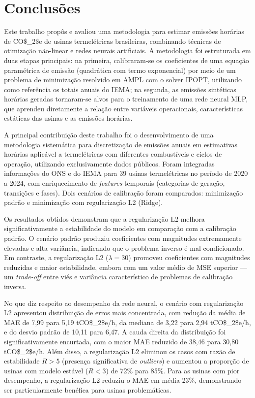 \chapter{Conclusões}\label{chp:conc}

Este trabalho propôs e avaliou uma metodologia para estimar emissões horárias de \ac{CO$_2$e} de usinas termelétricas brasileiras, combinando técnicas de otimização não-linear e redes neurais artificiais. A metodologia foi estruturada em duas etapas principais: na primeira, calibraram-se os coeficientes de uma equação paramétrica de emissão (quadrática com termo exponencial) por meio de um problema de minimização resolvido em \ac{AMPL} com o solver \ac{IPOPT}, utilizando como referência os totais anuais do \ac{IEMA}; na segunda, as emissões sintéticas horárias geradas tornaram-se alvos para o treinamento de uma rede neural \ac{MLP}, que aprendeu diretamente a relação entre variáveis operacionais, características estáticas das usinas e as emissões horárias.

A principal contribuição deste trabalho foi o desenvolvimento de uma metodologia sistemática para discretização de emissões anuais em estimativas horárias aplicável a termelétricas com diferentes combustíveis e ciclos de operação, utilizando exclusivamente dados públicos. Foram integradas informações do \ac{ONS} e do \ac{IEMA} para 39 usinas termelétricas no período de 2020 a 2024, com enriquecimento de \textit{features} temporais (categorias de geração, transições e fases). Dois cenários de calibração foram comparados: minimização padrão e minimização com regularização L2 (Ridge).

Os resultados obtidos demonstram que a regularização L2 melhora significativamente a estabilidade do modelo em comparação com a calibração padrão. O cenário padrão produziu coeficientes com magnitudes extremamente elevadas e alta variância, indicando que o problema inverso é mal condicionado. Em contraste, a regularização L2 (\(\lambda = 30\)) promoveu coeficientes com magnitudes reduzidas e maior estabilidade, embora com um valor médio de \ac{MSE} superior — um \textit{trade-off} entre viés e variância característico de problemas de calibração inversa.

No que diz respeito ao desempenho da rede neural, o cenário com regularização L2 apresentou distribuição de erros mais concentrada, com redução da média de \ac{MAE} de 7,99 para 5,19 \ac{tCO$_2$e}/h, da mediana de 3,22 para 2,94 \ac{tCO$_2$e}/h, e do desvio padrão de 10,11 para 6,47. A cauda direita da distribuição foi significativamente encurtada, com o maior \ac{MAE} reduzido de 38,46 para 30,80 \ac{tCO$_2$e}/h. Além disso, a regularização L2 eliminou os casos com razão de estabilidade \(R > 5\) (presença significativa de \textit{outliers}) e aumentou a proporção de usinas com modelo estável (\(R < 3\)) de 72\% para 85\%. Para as usinas com pior desempenho, a regularização L2 reduziu o \ac{MAE} em média 23\%, demonstrando ser particularmente benéfica para usinas problemáticas.

